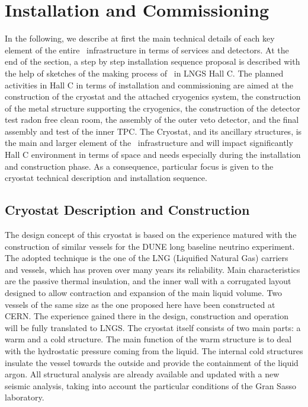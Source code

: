 \section{Installation and Commissioning}
\label{sec:InstallationAndCommissioning}


In the following, we describe at first the main technical details of each key element of the
entire \DSks\ infrastructure in terms of services and detectors. At the end of the
section, a step by step installation sequence proposal is described with the help of sketches of
the making process of \DSks\ in LNGS Hall C.
The planned activities in Hall C in terms of installation and commissioning are aimed at the
construction of the cryostat and the attached cryogenics system, the construction of the metal
structure supporting the cryogenics, the construction of the detector test radon free clean
room, the assembly of the outer veto detector, and the final assembly and test of the inner
TPC.
The Cryostat, and its ancillary structures, is the main and larger element of the \DSks\
infrastructure and will impact significantly Hall C environment in terms of space and needs
especially during the installation and construction phase. As a consequence, particular focus is
given to the cryostat technical description and installation sequence.

\subsection{Cryostat Description and Construction}
\label{sec:CryostatConstruction}

The design concept of this cryostat is based on the experience matured with the construction
of similar vessels for the DUNE long baseline neutrino experiment. The adopted technique is
the one of the LNG (Liquified Natural Gas) carriers and vessels, which has proven over many
years its reliability. Main characteristics are the passive thermal insulation, and the inner wall
with a corrugated layout designed to allow contraction and expansion of the main liquid
volume.
Two vessels of the same size as the one proposed here have been constructed at CERN. The
experience gained there in the design, construction and operation will be fully translated to
LNGS.
The cryostat itself consists of two main parts: a warm and a cold structure. The main function
of the warm structure is to deal with the hydrostatic pressure coming from the liquid. The
internal cold structures insulate the vessel towards the outside and provide the containment of
the liquid argon. All structural analysis are already available and updated with a new seismic
analysis, taking into account the particular conditions of the Gran Sasso laboratory.

